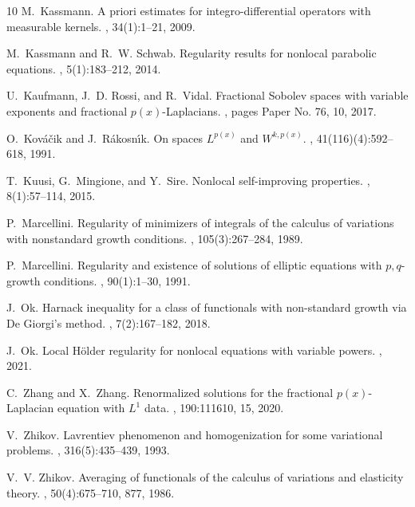 \documentclass[11pt]{amsart}
\theoremstyle{plain}
\theoremstyle{definition}
\numberwithin{equation}{section}
\begin{document}
\begin{thebibliography}{10}
M.~Kassmann.
\newblock A priori estimates for integro-differential operators with measurable
  kernels.
, 34(1):1--21, 2009.

M.~Kassmann and R.~W. Schwab.
\newblock Regularity results for nonlocal parabolic equations.
, 5(1):183--212, 2014.

U.~Kaufmann, J.~D. Rossi, and R.~Vidal.
\newblock Fractional {S}obolev spaces with variable exponents and fractional
  {$p(x)$}-{L}aplacians.
, pages Paper No. 76, 10,
  2017.

O.~Kov\'{a}\v{c}ik and J.~R\'{a}kosn\'{\i}k.
\newblock On spaces {$L^{p(x)}$} and {$W^{k,p(x)}$}.
, 41(116)(4):592--618, 1991.

T.~Kuusi, G.~Mingione, and Y.~Sire.
\newblock Nonlocal self-improving properties.
, 8(1):57--114, 2015.

P.~Marcellini.
\newblock Regularity of minimizers of integrals of the calculus of variations
  with nonstandard growth conditions.
, 105(3):267--284, 1989.

P.~Marcellini.
\newblock Regularity and existence of solutions of elliptic equations with
  {$p,q$}-growth conditions.
, 90(1):1--30, 1991.

J.~Ok.
\newblock Harnack inequality for a class of functionals with non-standard
  growth via {D}e {G}iorgi's method.
, 7(2):167--182, 2018.

J.~Ok.
\newblock Local {H}\"older regularity for nonlocal equations with
  variable powers.
, 2021.

C.~Zhang and X.~Zhang.
\newblock Renormalized solutions for the fractional {$p(x)$}-{L}aplacian
  equation with {$L^1$} data.
, 190:111610, 15, 2020.

V.~Zhikov.
\newblock Lavrentiev phenomenon and homogenization for some variational
  problems.
, 316(5):435--439, 1993.

V.~V. Zhikov.
\newblock Averaging of functionals of the calculus of variations and elasticity
  theory.
, 50(4):675--710, 877, 1986.


\end{thebibliography}
\end{document}
